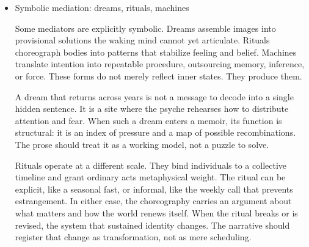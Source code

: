 \documentclass[11pt]{article}
\begin{document}
\begin{itemize}
Distributed agency recalibrates narrative hierarchy. The protagonist becomes one among many actants whose alignments produce outcomes. This is not an abdication of perspective. It is a refusal to pretend that intention is the only mover. Once the network is visible, causality turns from single arrows into braided strands. Scenes that once looked like personal triumphs or failures reveal their infrastructure: the teammate who forwarded a message, the stranger whose silence set a limit, the policy that corralled options, the machine that kept counting, the natural system that kept flooding. The point is not to equalize all actors. It is to count the right ones.

Writing distributed causality requires craft choices that prevent diffusion. Too many agents and the scene loses pressure; too few and it tilts into myth. The calibration test is simple to state and difficult to meet: if an actant can be removed without changing the meaning of the scene, it was never an actant in the first place. The page should treat it accordingly.
\item Symbolic mediation: dreams, rituals, machines
\label{sec:org5ca39eb}

Some mediators are explicitly symbolic. Dreams assemble images into provisional solutions the waking mind cannot yet articulate. Rituals choreograph bodies into patterns that stabilize feeling and belief. Machines translate intention into repeatable procedure, outsourcing memory, inference, or force. These forms do not merely reflect inner states. They produce them.

A dream that returns across years is not a message to decode into a single hidden sentence. It is a site where the psyche rehearses how to distribute attention and fear. When such a dream enters a memoir, its function is structural: it is an index of pressure and a map of possible recombinations. The prose should treat it as a working model, not a puzzle to solve.

Rituals operate at a different scale. They bind individuals to a collective timeline and grant ordinary acts metaphysical weight. The ritual can be explicit, like a seasonal fast, or informal, like the weekly call that prevents estrangement. In either case, the choreography carries an argument about what matters and how the world renews itself. When the ritual breaks or is revised, the system that sustained identity changes. The narrative should register that change as transformation, not as mere scheduling.


\end{itemize}
\end{document}
